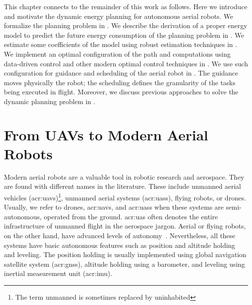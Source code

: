 This chapter connects to the remainder of this work as follows. Here we introduce and motivate the dynamic energy planning for autonomous aerial robots. We formalize the planning problem in . We describe the derivation of a proper energy model to predict the future energy consumption of the planning problem in . We estimate some coefficients of the model using robust estimation techniques in . We implement an optimal configuration of the path and computations using data-driven control and other modern optimal control techniques in . We use such configuration for guidance and scheduling of the aerial robot in . The guidance moves physically the robot; the scheduling defines the granularity of the tasks being executed in flight. Moreover, we discuss previous approaches to solve the dynamic planning problem in . 


\section{From UAVs to Modern Aerial Robots}

Modern aerial robots are a valuable tool in robotic research and aerospace. They are found with different names in the literature. These include unmanned aerial vehicles (\Gls{acr:uav}s)\footnote{The term unmanned is sometimes replaced by uninhabited}, unmanned aerial systems (\Gls{acr:uas}s), flying robots, or drones. Usually, we refer to drones, \Gls{acr:uav}s, and \Gls{acr:uas}s when these systems are semi-autonomous, operated from the ground. \Gls{acr:uas} often denotes the entire infrastructure of unmanned flight in the aerospace jargon. Aerial or flying robots, on the other hand, have advanced levels of autonomy~\citep{siciliano2016springer}. Nevertheless, all these systems have basic autonomous features such as position and altitude holding and leveling. The position holding is usually implemented using global navigation satellite system (\Gls{acr:gnss}), altitude holding using a barometer, and leveling using inertial measurement unit (\Gls{acr:imu}).

